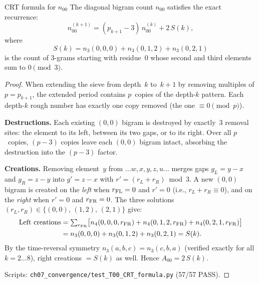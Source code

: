 \documentclass[12pt,a4paper]{article}
\begin{document}
\begin{thmbox}{CRT formula for $n_{00}$}
\label{thm:n00_CRT}
The diagonal bigram count $n_{00}$ satisfies the exact recurrence:
\begin{equation}
  n_{00}^{(k+1)} = (p_{k+1} - 3)\,n_{00}^{(k)} + 2\,S(k),
  \label{eq:n00_CRT}
\end{equation}
where
\begin{equation}
  S(k) = n_3(0,0,0) + n_3(0,1,2) + n_3(0,2,1)
  \label{eq:S_def}
\end{equation}
is the count of 3-grams starting with residue~$0$ whose second and
third elements sum to $0\!\pmod{3}$.

\begin{proof}
When extending the sieve from depth~$k$ to~$k{+}1$ by removing
multiples of $p = p_{k+1}$, the extended period contains $p$~copies of
the depth-$k$ pattern.  Each depth-$k$ rough number has exactly one
copy removed (the one $\equiv 0\!\pmod{p}$).

\textbf{Destructions.}  Each existing $(0,0)$ bigram is destroyed by
exactly~$3$ removal sites: the element to its left, between its two
gaps, or to its right.  Over all $p$~copies, $(p{-}3)$ copies leave
each $(0,0)$ bigram intact, absorbing the destruction into the
$(p{-}3)$ factor.

\textbf{Creations.}  Removing element~$y$ from $\ldots w,x,y,z,u\ldots$
merges gaps $g_L = y{-}x$ and $g_R = z{-}y$ into
$g' = z{-}x$ with $r' = (r_L + r_R)\!\bmod{3}$.  A new $(0,0)$ bigram
is created on the \emph{left} when $r_{\rm FL} = 0$ and $r' = 0$
(i.e., $r_L + r_R \equiv 0$), and on the \emph{right} when $r' = 0$
and $r_{\rm FR} = 0$.  The three solutions
$(r_L, r_R) \in \{(0,0),\,(1,2),\,(2,1)\}$ give:
\begin{align}
  \text{Left creations} &= \textstyle\sum_{r_{\rm FR}}
    \bigl[n_4(0,0,0,r_{\rm FR}) + n_4(0,1,2,r_{\rm FR})
    + n_4(0,2,1,r_{\rm FR})\bigr] \notag\\
  &= n_3(0,0,0) + n_3(0,1,2) + n_3(0,2,1) = S(k).
\end{align}
By the time-reversal symmetry $n_3(a,b,c) = n_3(c,b,a)$
(verified exactly for all $k = 2\ldots 8$), right creations $= S(k)$
as well.  Hence $A_{00} = 2\,S(k)$.

Scripts: \texttt{ch07\_convergence/test\_T00\_CRT\_formula.py} (57/57 PASS).
\end{proof}
\end{thmbox}
\end{document}
